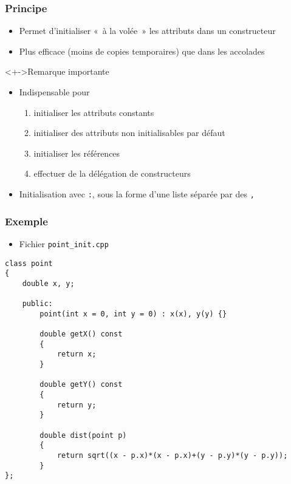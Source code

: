 \begin{frame}
\frametitle{Principe}
\begin{itemize}[<+->]
\item Permet d'initialiser «~à la volée~» les attributs dans un constructeur
\item Plus efficace (moins de copies temporaires) que dans les accolades
\end{itemize}
\begin{alertblock}<+->{Remarque importante}
	\begin{itemize}[<+->]
	\item Indispensable pour
		\begin{enumerate}
		\item initialiser les attributs constants
		\item initialiser des attributs non initialisables par défaut
		\item initialiser les références
		\item effectuer de la délégation de constructeurs
		\end{enumerate}
	\end{itemize}
\end{alertblock}
\begin{itemize}[<+->]
\item Initialisation avec \texttt{:}, sous la forme d'une liste séparée par des \texttt{,}
\end{itemize}
\end{frame}

\begin{frame}[containsverbatim]
\frametitle{Exemple}
\begin{itemize}
\item Fichier \texttt{point\_init.cpp}
\end{itemize}
\begin{lstlisting}
class point
{
	double x, y;

	public:
		point(int x = 0, int y = 0) : x(x), y(y) {}

		double getX() const
		{
			return x;
		}

		double getY() const
		{
			return y;
		}		

		double dist(point p)
		{
			return sqrt((x - p.x)*(x - p.x)+(y - p.y)*(y - p.y));
		} 	
};
\end{lstlisting}
\end{frame}

